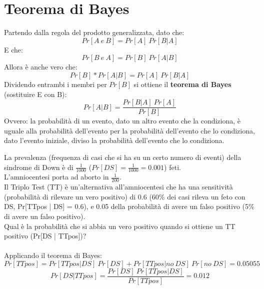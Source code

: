 \documentclass[10pt, draft]{book}
\newcounter{example}[section]
\begin{document}
\section{Teorema di Bayes}
Partendo dalla regola del prodotto generalizzata, dato che:
\begin{equation}
    Pr[A\ e\ B] = Pr[A]\ Pr[B|A] 
\end{equation}
E che:
\begin{equation}
    Pr[B\ e\ A] = Pr[B]\ Pr[A|B] 
\end{equation}
Allora è anche vero che:
\begin{equation}
    Pr[B] * Pr[A|B] = Pr[A]\ Pr[B|A] 
\end{equation}
Dividendo entrambi i membri per $Pr[B]$ si ottiene il \textbf{teorema di Bayes} (sostituire E con B):
\begin{equation}
    Pr[A|B] = \frac{Pr[B|A]\ Pr[A]}{Pr[B]}
\end{equation}
Ovvero: la probabilità di un evento, dato un altro evento che la condiziona, è uguale alla probabilità dell’evento per la probabilità dell’evento che lo condiziona, dato l’evento iniziale, diviso la probabilità dell’evento che lo condiziona.
\begin{example}
    La prevalenza (frequenza di casi che si ha su un certo numero di eventi) della sindrome di Down è di $\frac{1}{1000}$ ($Pr[DS] = \frac{1}{1000} = 0.001$) feti.
    \\
    L’amniocentesi porta ad aborto in $\frac{1}{200}$.
    \\
    Il Triplo Test (TT) è un’alternativa all’amniocentesi che ha una sensitività (probabilità di rilevare un vero positivo) di 0.6 (60\% dei casi rileva un feto con DS, Pr[TTpos | DS] = 0.6), e 0.05 della probabilità di avere un falso positivo (5\% di avere un falso positivo).
    \\
    Qual è la probabilità che si abbia un vero positivo quando si ottiene un TT positivo (Pr[DS | TTpos])?
    \\
    \\
    Applicando il teorema di Bayes:
    \begin{equation}
        Pr[TTpos] = Pr[TTpos | DS]\ Pr[DS] + Pr[TTpos | no\ DS]\ Pr[no\ DS] = 0.05055
    \end{equation}
    \begin{equation}
        Pr[DS | TTpos] = \frac{Pr[DS]\ Pr[TTpos | DS]}{Pr[TTpos]}= 0.012
    \end{equation}
\end{example}
\end{document}
